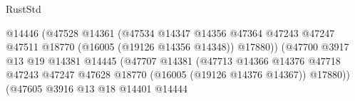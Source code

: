 \begin{lexlean}{RustStd}
\begin{coremodule}
                                                            @14446
                                                            (@47528
                                                              @14361
                                                              (@47534
                                                                @14347
                                                                @14356
                                                                @47364
                                                                @47243
                                                                @47247
                                                                @47511
                                                                @18770
                                                                (@16005 (@19126 @14356 @14348))
                                                                @17880))
                                                            (@47700
                                                              @3917
                                                              @13
                                                              @19
                                                              @14381
                                                              @14445
                                                              (@47707
                                                                @14381
                                                                (@47713
                                                                  @14366
                                                                  @14376
                                                                  @47718
                                                                  @47243
                                                                  @47247
                                                                  @47628
                                                                  @18770
                                                                  (@16005 (@19126 @14376 @14367))
                                                                  @17880))
                                                              (@47605
                                                                @3916
                                                                @13
                                                                @18
                                                                @14401
                                                                @14444

\end{coremodule}
\end{lexlean}
